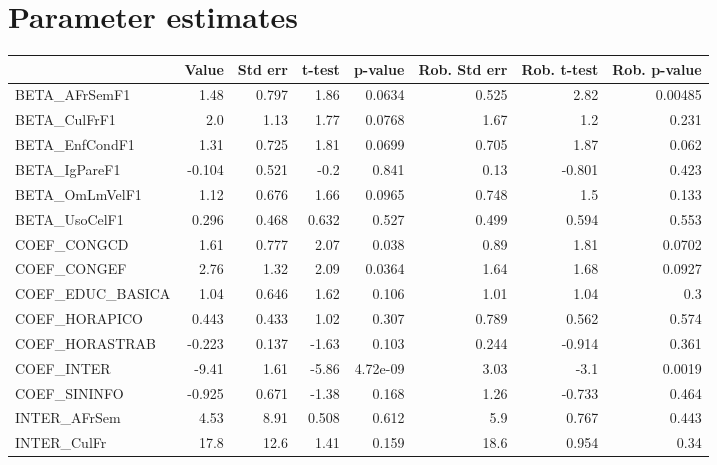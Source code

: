\section{Parameter estimates}
\begin{tabular}{lrrrrrrr}
\toprule
{} &  Value &  Std err &  t-test &  p-value &  Rob. Std err &  Rob. t-test &  Rob. p-value \\
\midrule
BETA\_AFrSemF1      &   1.48 &    0.797 &    1.86 &   0.0634 &         0.525 &         2.82 &       0.00485 \\
BETA\_CulFrF1       &    2.0 &     1.13 &    1.77 &   0.0768 &          1.67 &          1.2 &         0.231 \\
BETA\_EnfCondF1     &   1.31 &    0.725 &    1.81 &   0.0699 &         0.705 &         1.87 &         0.062 \\
BETA\_IgPareF1      & -0.104 &    0.521 &    -0.2 &    0.841 &          0.13 &       -0.801 &         0.423 \\
BETA\_OmLmVelF1     &   1.12 &    0.676 &    1.66 &   0.0965 &         0.748 &          1.5 &         0.133 \\
BETA\_UsoCelF1      &  0.296 &    0.468 &   0.632 &    0.527 &         0.499 &        0.594 &         0.553 \\
COEF\_CONGCD        &   1.61 &    0.777 &    2.07 &    0.038 &          0.89 &         1.81 &        0.0702 \\
COEF\_CONGEF        &   2.76 &     1.32 &    2.09 &   0.0364 &          1.64 &         1.68 &        0.0927 \\
COEF\_EDUC\_BASICA   &   1.04 &    0.646 &    1.62 &    0.106 &          1.01 &         1.04 &           0.3 \\
COEF\_HORAPICO      &  0.443 &    0.433 &    1.02 &    0.307 &         0.789 &        0.562 &         0.574 \\
COEF\_HORASTRAB     & -0.223 &    0.137 &   -1.63 &    0.103 &         0.244 &       -0.914 &         0.361 \\
COEF\_INTER         &  -9.41 &     1.61 &   -5.86 & 4.72e-09 &          3.03 &         -3.1 &        0.0019 \\
COEF\_SININFO       & -0.925 &    0.671 &   -1.38 &    0.168 &          1.26 &       -0.733 &         0.464 \\
INTER\_AFrSem       &   4.53 &     8.91 &   0.508 &    0.612 &           5.9 &        0.767 &         0.443 \\
INTER\_CulFr        &   17.8 &     12.6 &    1.41 &    0.159 &          18.6 &        0.954 &          0.34 \\

\end{tabular}
